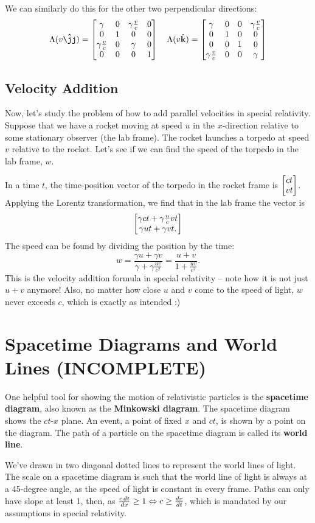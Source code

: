 \documentclass[12pt]{scrartcl}
\newcommand{\incfig}[2]{
    \def\svgscale{#1}
    
}
\begin{document}
We can similarly do this for the other two perpendicular directions:
\[ \Lambda(v \jhatt) =
	\bmat{
		\gamma             & 0 & \gamma \frac{v}{c} & 0 \\
		0                  & 1 & 0                  & 0 \\
		\gamma \frac{v}{c} & 0 & \gamma             & 0 \\
		0                  & 0 & 0                  & 1
	}
	\quad
	\Lambda(v\hat{\bf k}) =
	\bmat{
		\gamma             & 0 & 0 & \gamma\frac{v}{c} \\
		0                  & 1 & 0 & 0                 \\
		0                  & 0 & 1 & 0                 \\
		\gamma \frac{v}{c} & 0 & 0 & \gamma
	}
\]

\subsection*{Velocity Addition}
Now, let's study the problem of how to add parallel velocities in special relativity. Suppose that we have a rocket moving at speed $u$ in the $x$-direction relative to some stationary observer (the lab frame). The rocket launches a torpedo at speed $v$ relative to the rocket. Let's see if we can find the speed of the torpedo in the lab frame, $w$.

In a time $t$, the time-position vector of the torpedo in the rocket frame is $\begin{bmatrix}ct \\ vt\end{bmatrix}$. Applying the Lorentz transformation, we find that in the lab frame the vector is
\[
	\begin{bmatrix}
		\gamma c t + \gamma \frac u c v t \\
		\gamma u t + \gamma v t.
	\end{bmatrix}
\]
The speed can be found by dividing the position by the time:
\[
	w = \frac{\gamma u + \gamma v}{\gamma + \gamma \frac{uv}{c^2}} = \frac{u+v}{1+\frac{uv}{c^2}}.
\]
This is the velocity addition formula in special relativity -- note how it is not just $u + v$ anymore! Also, no matter how close $u$ and $v$ come to the speed of light, $w$ never exceeds $c$, which is exactly as intended :)

\section{Spacetime Diagrams and World Lines (INCOMPLETE)}
One helpful tool for showing the motion of relativistic particles is the \textbf{spacetime diagram}, also known as the \textbf{Minkowski diagram}. The spacetime diagram shows the $ct$-$x$ plane. An event, a point of fixed $x$ and $ct$, is shown by a point on the diagram. The path of a particle on the spacetime diagram is called its \textbf{world line}.
\begin{center}
	\incfig{2.5}{figures/minkowski-diag}
\end{center}
We've drawn in two diagonal dotted lines to represent the world lines of light. The scale on a spacetime diagram is such that the world line of light is always at a 45-degree angle, as the speed of light is constant in every frame. Paths can only have slope at least 1, then, as $\frac{c \, dt}{dx} \geq 1 \Leftrightarrow c \geq \frac{d x}{d t}$, which is mandated by our assumptions in special relativity.
\end{document}
